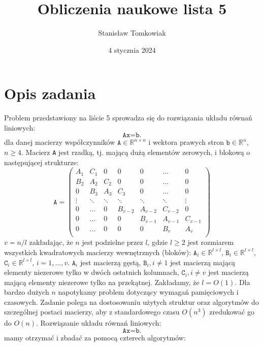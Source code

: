 \documentclass{article}
\title{Obliczenia naukowe lista 5}
\author{Stanisław Tomkowiak}
\date{4 stycznia 2024}
\begin{document}
\maketitle


\section*{Opis zadania}
Problem przedstawiony na liście 5 sprowadza się do rozwiązania układu równań liniowych:
\[
\texttt{Ax=b.}
\]
dla danej macierzy współczynników $\texttt{A} \in \mathbb{R}^{n \times n}$ i wektora prawych stron $\texttt{b} \in \mathbb{R}^n$, $n \geq 4$. Macierz \texttt{A} jest rzadką, tj. mającą dużą elementów zerowych, i blokową o następującej strukturze:
\[
    \texttt{A}=
    \begin{pmatrix}
        A_1    & C_1    & 0      & 0       & 0       & ...     & 0       \\
        B_2    & A_2    & C_2    & 0       & 0       & ...     & 0       \\
        0      & B_3    & A_3    & C_3     & 0       & ...     & 0       \\
        \vdots & \ddots & \ddots & \ddots  & \ddots  & \ddots  & \vdots  \\
        0      & ...    & 0      & B_{v-2} & A_{v-2} & C_{v-2} & 0       \\
        0      & ...    & 0      & 0       & B_{v-1} & A_{v-1} & C_{v-1} \\
        0      & ...    & 0      & 0       & 0       & B_v     & A_v     \\
    \end{pmatrix}
\]
$v=n/l$ zakładając, że $n$ jest podzielne przez $l$, gdzie $l \ge 2$ jest rozmiarem wszystkich kwadratowych
macierzy wewnętrznych (bloków):
$\texttt{A}_i \in \mathbb{R}^{l \times l}$, $\texttt{B}_i \in \mathbb{R}^{l \times l}$, $\texttt{C}_i \in \mathbb{R}^{l \times l}$, $i=1,...,v$. $\texttt{A}_i$ jest macierzą gęstą, $\texttt{B}_i, i \neq 1$ jest macierzą mającą elementy niezerowe tylko w dwóch ostatnich kolumnach, $\texttt{C}_i, i \neq v$ jest macierzą mającą elementy niezerowe tylko na przekątnej. Zakładamy, że $l=O(1)$. Dla bardzo dużych $n$ napotykamy problem dotyczący wymagań pamięciowych i czasowych. Zadanie polega na dostosowaniu użytych struktur oraz algorytmów do szczególnej postaci macierzy, aby z standardowego czasu $O(n^3)$ zredukować go do $O(n)$. Rozwiązanie układu równań liniowych:
\[
\texttt{Ax=b.}
\] mamy otrzymać i zbadać za pomocą czterech algorytmów:
\end{document}
